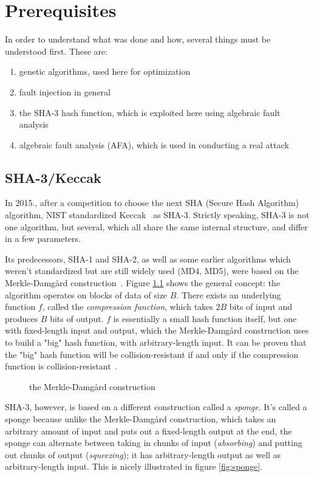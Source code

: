 \documentclass[times, utf8, diplomski]{fer}
\begin{document}
\chapter{Prerequisites}\label{ch:prerequisites}
In order to understand what was done and how, several things must be understood
first. These are:
\begin{enumerate}
    \item genetic algorithms, used here for optimization
    \item fault injection in general
    \item the SHA-3 hash function, which is exploited here using algebraic fault analysis
    \item algebraic fault analysis (AFA), which is used in conducting a real attack
\end{enumerate}


\section{SHA-3/Keccak}\label{sec:keccak}
In 2015., after a competition to choose the next SHA (Secure Hash Algorithm)
algorithm, NIST standardized Keccak~\cite{keccak_reference} as SHA-3.
Strictly speaking, SHA-3 is not one algorithm, but several, which all share
the same internal structure, and differ in a few parameters.

Its predecessors, SHA-1 and SHA-2, as well as some earlier algorithms which
weren't standardized but are still widely used (MD4, MD5), were based on the
Merkle-Damgård construction~\cite{merkle-damgard_reference}. Figure \ref{fig:merkle-damgard}
shows the general concept: the algorithm operates on blocks of data of size $B$.
There exists an underlying function $f$, called the \emph{compression function},
which takes $2B$ bits of input and produces $B$ bits of output. $f$ is essentially
a small hash function itself, but one with fixed-length input and output, which
the Merkle-Damgård construction uses to build a "big" hash function, with
arbitrary-length input. It can be proven that the "big" hash function will
be collision-resistant if and only if the compression function is
collision-resistant~\cite{}.

\begin{figure}[htb]\label{fig:merkle-damgard}
    \centering
    \caption{the Merkle-Damgård construction}
\end{figure}


SHA-3, however, is based on a different construction called a \emph{sponge}.
It's called a sponge because unlike the Merkle-Damgård construction, which takes
an arbitrary amount of input and puts out a fixed-length output at the end, the
sponge can alternate between taking in chunks of input (\emph{absorbing}) and
putting out chunks of output (\emph{squeezing}); it has arbitrary-length output
as well as arbitrary-length input.
This is nicely illustrated in figure \ref{fig:sponge}.
\end{document}

